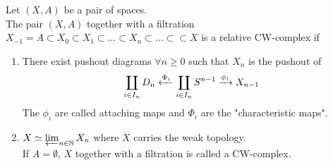 \documentclass[../main.tex]{subfiles}
\begin{document}
\begin{defn}[CW complexes]
	Let $( X,A) $ be a pair of spaces.\\
	The pair $( X,A) $ together with a filtration $X_{-1} = A \subset X_0 \subset X_1 \subset \ldots \subset X_n \subset \ldots \subset  \subset X$ is a relative CW-complex if
	\begin{enumerate}
	\item There exist pushout diagrams $\forall n \geq 0$ such that $X_n$ is the pushout of
		\[ 
			\coprod_{i \in I_n} D_n	\xleftarrow { \Phi_i} \coprod_{i \in I_n} S^{n-1}\xrightarrow{\phi_i} X_{n-1} 
		\]
The $\phi_i$ are called attaching maps and $\Phi_i$ are the "characteristic maps".
\item $X\simeq \varprojlim_{n \in \mathbb{N}} X_n$ where $X$ carries the weak topology.\\
	If $A= \emptyset$, $X$ together with a filtration is called a CW-complex.
	\end{enumerate}
	
\end{defn}
\end{document}
